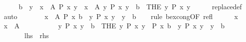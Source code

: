 \begin{isabellebody}
\ {\isacharminus}{\kern0pt}\isanewline
\ \ \isamarkupfalse%
\ {\isachardoublequoteopen}b\ {\isasymin}\ {\isacharbraceleft}{\kern0pt}y\ {\isacharbar}{\kern0pt}\ x\ {\isasymin}\ A{\isacharcomma}{\kern0pt}\ P\ x\ y{\isacharbraceright}{\kern0pt}\ {\isasymlongleftrightarrow}\ {\isacharparenleft}{\kern0pt}{\isasymexists}x\ {\isasymin}\ A{\isachardot}{\kern0pt}\ {\isacharparenleft}{\kern0pt}{\isasymexists}{\isacharbang}{\kern0pt}y{\isachardot}{\kern0pt}\ P\ x\ y{\isacharparenright}{\kern0pt}\ {\isasymand}\ b\ {\isacharequal}{\kern0pt}\ {\isacharparenleft}{\kern0pt}THE\ y{\isachardot}{\kern0pt}\ P\ x\ y{\isacharparenright}{\kern0pt}{\isacharparenright}{\kern0pt}{\isachardoublequoteclose}\isanewline
\ \ \ \ \isamarkupfalse%
\ replace{\isacharunderscore}{\kern0pt}def\ \isamarkupfalse%
\ auto\isanewline
\ \ \isamarkupfalse%
\ \isamarkupfalse%
\ {\isachardoublequoteopen}{\isachardot}{\kern0pt}{\isachardot}{\kern0pt}{\isachardot}{\kern0pt}\ {\isasymlongleftrightarrow}\ {\isacharparenleft}{\kern0pt}{\isasymexists}x\ {\isasymin}\ A{\isachardot}{\kern0pt}\ P\ x\ b\ {\isasymand}\ {\isacharparenleft}{\kern0pt}{\isasymforall}y{\isachardot}{\kern0pt}\ P\ x\ y\ {\isasymlongrightarrow}\ y\ {\isacharequal}{\kern0pt}\ b{\isacharparenright}{\kern0pt}{\isacharparenright}{\kern0pt}{\isachardoublequoteclose}\isanewline
\ \ \isamarkupfalse%
\ {\isacharparenleft}{\kern0pt}rule\ bex{\isacharunderscore}{\kern0pt}cong{\isacharbrackleft}{\kern0pt}OF\ refl{\isacharbrackright}{\kern0pt}{\isacharparenright}{\kern0pt}\isanewline
\ \ \ \ \isamarkupfalse%
\ x\ \isamarkupfalse%
\ {\isachardoublequoteopen}x\ {\isasymin}\ A{\isachardoublequoteclose}\isanewline
\ \ \ \ \isamarkupfalse%
\isanewline
\ \ \ \ \ \ {\isachardoublequoteopen}{\isacharparenleft}{\kern0pt}{\isasymexists}{\isacharbang}{\kern0pt}y{\isachardot}{\kern0pt}\ P\ x\ y{\isacharparenright}{\kern0pt}\ {\isasymand}\ b\ {\isacharequal}{\kern0pt}\ {\isacharparenleft}{\kern0pt}THE\ y{\isachardot}{\kern0pt}\ P\ x\ y{\isacharparenright}{\kern0pt}\ {\isasymlongleftrightarrow}\ P\ x\ b\ {\isasymand}\ {\isacharparenleft}{\kern0pt}{\isasymforall}y{\isachardot}{\kern0pt}\ P\ x\ y\ {\isasymlongrightarrow}\ y\ {\isacharequal}{\kern0pt}\ b{\isacharparenright}{\kern0pt}{\isachardoublequoteclose}\isanewline
\ \ \ \ \ \ {\isacharparenleft}{\kern0pt}\ {\isachardoublequoteopen}{\isacharquery}{\kern0pt}lhs\ {\isasymlongleftrightarrow}\ {\isacharquery}{\kern0pt}rhs{\isachardoublequoteclose}{\isacharparenright}{\kern0pt}\isanewline

\end{isabellebody}
